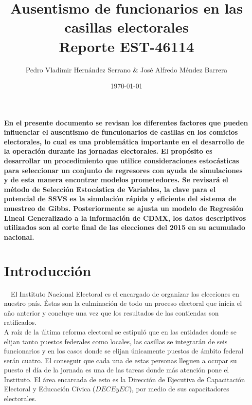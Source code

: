 \documentclass[DIV=calc, 
					paper=letter, 
					fontsize=11pt, 
					twocolumn]{scrartcl}
\title{\Huge Ausentismo de funcionarios en las casillas electorales \\
Reporte EST-46114} %
\author{	Pedro Vladimir Hern\'andez Serrano 
			\& 
			Jos\'e Alfredo M\'endez Barrera }
\date{\today} %
\begin{document}
\maketitle %

\thispagestyle{fancy} %


\textbf{En el presente documento se revisan los diferentes factores que pueden influenciar el ausentismo de funcuionarios de casillas en los comicios electorales, lo cual es una problem\'atica importante en el desarrollo de la operaci\'on durante las jornadas electorales. El prop\'osito es desarrollar un procedimiento que utilice consideraciones estoc\'asticas para seleccionar un conjunto de regresores con ayuda de simulaciones y de esta manera encontrar modelos prometedores. Se revisar\'a el m\'etodo de Selecci\'on Estoc\'astica de Variables, la clave para el potencial de SSVS es la simulaci\'on r\'apida y eficiente del sistema de muestreo de Gibbs. Posteriormente se ajusta un modelo de Regresi\'on Lineal Generalizado a la informaci\'on de CDMX, los datos descriptivos utilizados son al corte final de las elecciones del 2015 en su acumulado nacional.}

\section{Introducci\'on}
\vspace{3mm}

~~El Instituto Nacional Electoral es el encargado de organizar las elecciones en nuestro país. \'Estas son la culminaci\'on de todo un proceso electoral que inicia el a\~no anterior y concluye una vez que los resultados de las contiendas son ratificados.\\

A ra\'iz de la \'ultima reforma electoral se estipul\'o que en las entidades donde se elijan tanto puestos federales como locales, las casillas se integrar\'an de seis funcionarios y en los casos donde se elijan \'unicamente puestos de \'ambito federal ser\'an cuatro. El conseguir que cada una de estas personas lleguen a ocupar su puesto el d\'ia de la jornada es una de las tareas donde m\'as atenci\'on pone el Instituto. El \'area encarcada de esto es la Direcci\'on de Ejecutiva de Capacitaci\'on Electoral y Educaci\'on C\'ivica ($DECEyEC$), por medio de sus capacitadores electorales.\\
\end{document}
